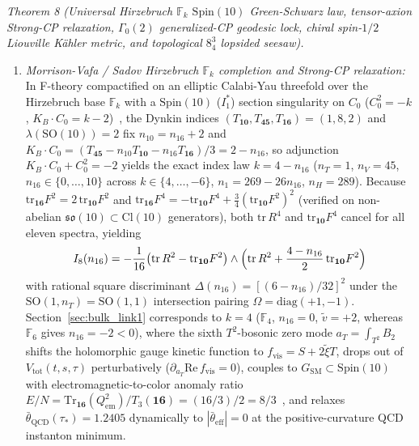 \documentclass[aps,prd,twocolumn,nofootinbib,floatfix]{revtex4-2}
\begin{document}
\emph{Theorem 8 (Universal Hirzebruch $\mathbb{F}_k$ $\mathrm{Spin}(10)$ Green-Schwarz law, tensor-axion Strong-CP relaxation, $\Gamma_0(2)$ generalized-CP geodesic lock, chiral spin-$1/2$ Liouville K\"ahler metric, and topological $8^3_4$ lopsided seesaw).}
\begin{enumerate}
    \item \emph{Morrison-Vafa / Sadov Hirzebruch $\mathbb{F}_k$ completion and Strong-CP relaxation:} In F-theory compactified on an elliptic Calabi-Yau threefold over the Hirzebruch base $\mathbb{F}_k$ with a $\mathrm{Spin}(10)$ ($I_1^*$) section singularity on $C_0$ ($C_0^2 = -k$, $K_B\cdot C_0 = k - 2$)~\cite{MorrisonVafa1996,Sadov1996,KumarMorrisonTaylor2010}, the Dynkin indices $(T_{\mathbf{10}}, T_{\mathbf{45}}, T_{\mathbf{16}}) = (1, 8, 2)$ and $\lambda(\mathrm{SO}(10)) = 2$ fix $n_{10} = n_{16} + 2$ and $K_B\cdot C_0 = (T_{\mathbf{45}} - n_{10} T_{\mathbf{10}} - n_{16} T_{\mathbf{16}})/3 = 2 - n_{16}$, so adjunction $K_B\cdot C_0 + C_0^2 = -2$ yields the exact index law $k = 4 - n_{16}$ ($n_T = 1$, $n_V = 45$, $n_{16} \in \{0,\dots,10\}$ across $k \in \{4,\dots,-6\}$, $n_1 = 269 - 26 n_{16}$, $n_H = 289$). Because $\mathrm{tr}_{\mathbf{16}} F^2 = 2\,\mathrm{tr}_{\mathbf{10}} F^2$ and $\mathrm{tr}_{\mathbf{16}} F^4 = -\mathrm{tr}_{\mathbf{10}} F^4 + \frac{3}{4}(\mathrm{tr}_{\mathbf{10}} F^2)^2$ (verified on non-abelian $\mathfrak{so}(10) \subset \mathrm{Cl}(10)$ generators), both $\mathrm{tr}\,R^4$ and $\mathrm{tr}_{\mathbf{10}} F^4$ cancel for all eleven spectra, yielding
    \begin{equation}
    \label{eq:i8_hirzebruch_universal}
    I_8(n_{16}) = -\frac{1}{16}\bigl(\mathrm{tr}\,R^2 - \mathrm{tr}_{\mathbf{10}} F^2\bigr)\wedge\Bigl(\mathrm{tr}\,R^2 + \frac{4 - n_{16}}{2}\,\mathrm{tr}_{\mathbf{10}} F^2\Bigr)
    \end{equation}
    with rational square discriminant $\Delta(n_{16}) = [(6 - n_{16})/32]^2$ under the $\mathrm{SO}(1,n_T) = \mathrm{SO}(1,1)$ intersection pairing $\Omega = \mathrm{diag}(+1,-1)$. Section~\ref{sec:bulk_link1} corresponds to $k = 4$ ($\mathbb{F}_4$, $n_{16} = 0$, $\tilde{v} = +2$, whereas $\mathbb{F}_6$ gives $n_{16} = -2 < 0$), where the sixth $T^2$-bosonic zero mode $a_T = \int_{T^2} B_2$ shifts the holomorphic gauge kinetic function to $f_{\mathrm{vis}} = S + 2\tilde{\xi}T$, drops out of $V_{\mathrm{tot}}(t,s,\tau)$ perturbatively ($\partial_{a_T}\mathrm{Re}\,f_{\mathrm{vis}} = 0$), couples to $G_{\mathrm{SM}} \subset \mathrm{Spin}(10)$ with electromagnetic-to-color anomaly ratio $E/N = \mathrm{Tr}_{\mathbf{16}}(Q_{\mathrm{em}}^2)/T_3(\mathbf{16}) = (16/3)/2 = 8/3$~\cite{Srednicki1985}, and relaxes $\bar{\theta}_{\mathrm{QCD}}(\tau_*) = 1.2405$ dynamically to $|\bar{\theta}_{\mathrm{eff}}| = 0$ at the positive-curvature QCD instanton minimum.

\end{enumerate}
\end{document}
